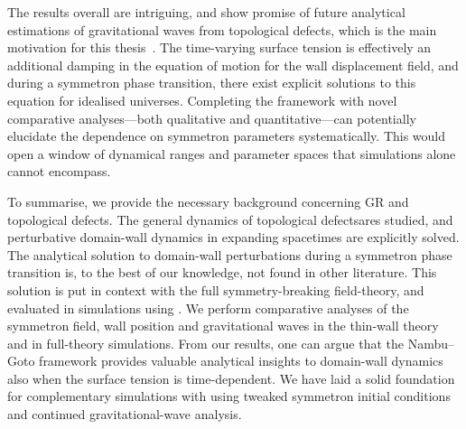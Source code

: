 

    The results overall are intriguing, and show promise of future 
    {analytical estimations of gravitational waves from topological defects}, 
    which is the main motivation for this thesis~\citep{saikawaReviewGravitationalWaves2017}. %
    The time-varying surface tension is effectively an additional damping in the equation of motion for the wall displacement field, and during a symmetron phase transition, there exist explicit solutions to this equation for idealised universes. Completing the framework with novel comparative analyses---both qualitative and quantitative---can potentially elucidate the dependence on symmetron parameters systematically. This would open a window of dynamical ranges and parameter spaces that simulations alone cannot encompass.


    To summarise, we provide the necessary background concerning GR and topological defects. The general dynamics of topological defectsares studied, and perturbative domain-wall dynamics in expanding spacetimes are explicitly solved. The analytical solution to domain-wall perturbations during a symmetron phase transition is, to the best of our knowledge, not found in other literature. 
    This solution is put in context with the full symmetry-breaking field-theory, and evaluated in simulations using \asgrd{}. We perform comparative analyses of the symmetron field, wall position and gravitational waves in the thin-wall theory and in full-theory simulations. From our results, one can argue that the Nambu--Goto framework provides valuable analytical insights to domain-wall dynamics also when the surface tension is time-dependent. We have laid a solid foundation for complementary simulations with \asgrd{} using tweaked symmetron initial conditions and continued gravitational-wave analysis.



